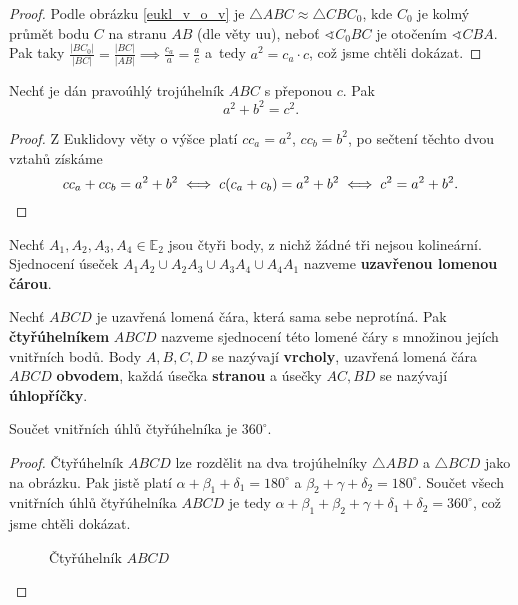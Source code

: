 \begin{proof}
  Podle obrázku \ref{eukl_v_o_v} je
  $\triangle ABC \approx \triangle CBC_0$, kde $C_0$ je kolmý průmět bodu $C$ na stranu $AB$ (dle věty uu), neboť $\sphericalangle C_0 BC$ je otočením $\sphericalangle CBA$. Pak taky $\frac{|BC_0|}{|BC|} = \frac{|BC|}{|AB|} \implies \frac{c_a}{a} = \frac{a}{c}$ a~tedy $a^2 = c_a \cdot c$, což jsme chtěli dokázat.
\end{proof}

\begin{veta}[Pythagorova]
  Nechť je dán pravoúhlý trojúhelník $ABC$ s přeponou $c$. Pak
  \[
    a^2+b^2 = c^2.
  \]
\end{veta}


\begin{proof}
  Z Euklidovy věty o výšce platí $cc_a=a^2$, $cc_b=b^2$, po sečtení těchto dvou vztahů získáme
  \[
    cc_a+cc_b=a^2+b^2 \iff c(c_a+c_b)=a^2+b^2 \iff c^2=a^2+b^2. \qedhere
  \]
\end{proof}

\begin{definition}
  Nechť $A_1,A_2, A_3, A_4 \in \mathbb E_2$ jsou čtyři body, z nichž žádné tři nejsou kolineární. Sjednocení úseček $A_1A_2\cup A_2A_3 \cup A_3A_4 \cup A_4A_1$ nazveme \textbf{uzavřenou lomenou čárou}.
\end{definition}

\begin{definition}
  Nechť $ABCD$ je uzavřená lomená čára, která sama sebe neprotíná. Pak \textbf{čtyřúhelníkem} $ABCD$ nazveme sjednocení této lomené čáry s množinou jejích vnitřních bodů. Body $A,B,C,D$ se nazývají \textbf{vrcholy}, uzavřená lomená čára $ABCD$ \textbf{obvodem}, každá úsečka \textbf{stranou} a úsečky $AC,BD$ se nazývají \textbf{úhlopříčky}.
\end{definition}

\begin{veta}
  Součet vnitřních úhlů čtyřúhelníka je $360^\circ$.
\end{veta}

\begin{proof}
  Čtyřúhelník $ABCD$ lze rozdělit na dva trojúhelníky
  $\triangle ABD $ a $\triangle BCD$ jako na obrázku.
  Pak jistě platí $\alpha + \beta_1 + \delta_1 = 180^\circ$ a
  $\beta_2 + \gamma + \delta_2 = 180^\circ$. Součet všech vnitřních úhlů
  čtyřúhelníka $ABCD$ je tedy $\alpha + \beta_1 + \beta_2 + \gamma + \delta_1
  + \delta_2 = 360^\circ$, což jsme chtěli dokázat.
  \begin{figure}[ht!]
    \centering
    \caption{Čtyřúhelník $ABCD$}
  \end{figure}
\end{proof}


